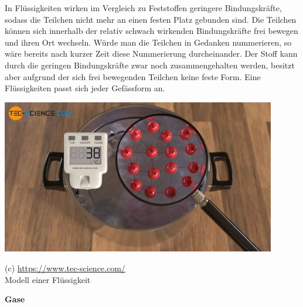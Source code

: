 \documentclass[11pt]{article}
\begin{document}
\begin{minipage}{0.65\textwidth}
In Flüssigkeiten wirken im Vergleich zu Feststoffen geringere Bindungskräfte, sodass die Teilchen nicht mehr an einen festen Platz gebunden sind. Die Teilchen können sich innerhalb der relativ schwach wirkenden Bindungskräfte frei bewegen und ihren Ort wechseln. Würde man die Teilchen in Gedanken nummerieren, so wäre bereits nach kurzer Zeit diese Nummerierung durcheinander. Der Stoff kann durch die geringen Bindungskräfte zwar noch zusammengehalten werden, besitzt aber aufgrund der sich frei bewegenden Teilchen keine feste Form. Eine Flüssigkeiten  passt sich jeder Gefässform an.
\vspace{0.5cm}
\end{minipage}
\begin{minipage}{0.32\textwidth}
    \begin{flushright}
        \includegraphics[trim=6.5cm 2.5cm 3.5cm 0.5cm, clip,width=0.9\textwidth]{images/aggregatzustand-fluessig.jpg}
    \end{flushright}
        {\scriptsize (c) \url{https://www.tec-science.com/}} \\
        {\scriptsize Modell einer Flüssigkeit}
\end{minipage}



\textbf{Gase}
\end{document}
